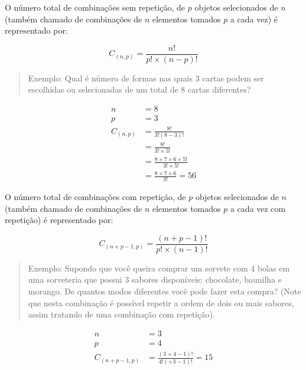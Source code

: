 \documentclass[
]{book}
\begin{document}
\hfill\break

O número total de combinações sem repetição, de \(p\) objetos selecionados de \(n\) (também chamado de combinações de \(n\) elementos tomados \(p\) a cada vez) é representado por:

\hfill\break
\[
C_{(n,p)} = \frac{ n! }{ p! \times ( n-p)!} 
\]

\hfill\break

\begin{quote}
Exemplo: Qual é número de formas nas quais \(3\) cartas podem ser escolhidas ou selecionadas de um total de \(8\) cartas diferentes?
\end{quote}

\hfill\break

\begin{align*}
n & = 8 \\
p & = 3 \\
C_{(n,p)} & = \frac{8!}{ 3! (8-3)!}  \\
          & = \frac{8!}{3! \times 5!} \\
          & = \frac{ 8 \times 7 \times 6 \times 5! }{ 3! \times 5! } \\
          & = \frac{ 8 \times 7 \times 6 }{3!} = 56  
\end{align*}

\hfill\break

O número total de combinações com repetição, de \(p\) objetos selecionados de \(n\) (também chamado de combinações de \(n\) elementos tomados \(p\) a cada vez com repetição) é representado por:

\hfill\break

\[
C_{(n+p-1,p)} = \frac{ (n+p-1)! }{ p! \times ( n-1)!}
\]

\hfill\break

\begin{quote}
Exemplo: Supondo que você queira comprar um sorvete com 4 bolas em uma sorveteria que possui 3 sabores disponíveis: chocolate, baunilha e morango. De quantos modos diferentes você pode fazer esta compra? (Note que nesta combinação é possível repetir a ordem de dois ou mais sabores, assim tratando de uma combinação com repetição).
\end{quote}

\hfill\break

\begin{align*}
n & =  3 \\
p & = 4 \\ 
C_{(n+p-1,p)} & = \frac{(3+4-1)!}{ 4! (+3-1)!} = 15  
\end{align*}
\end{document}
